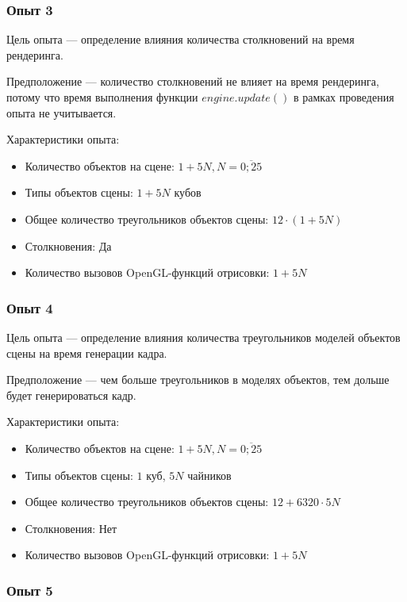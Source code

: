 \subsubsection{Опыт 3}

Цель опыта --- определение влияния количества столкновений на время рендеринга.

Предположение --- количество столкновений не влияет на время рендеринга, потому что время выполнения функции $engine.update()$ в рамках проведения опыта не учитывается.

Характеристики опыта:
\begin{itemize}
    \item Количество объектов на сцене: $1 + 5 N, N = \overline{0; 25}$
    \item Типы объектов сцены: $1 + 5 N$ кубов
    \item Общее количество треугольников объектов сцены: $12 \cdot (1 + 5 N)$
    \item Столкновения: Да
    \item Количество вызовов OpenGL-функций отрисовки: $1 + 5 N$
\end{itemize}

\subsubsection{Опыт 4}

Цель опыта --- определение влияния количества треугольников моделей объектов сцены на время генерации кадра.

Предположение --- чем больше треугольников в моделях объектов, тем дольше будет генерироваться кадр.

Характеристики опыта:
\begin{itemize}
    \item Количество объектов на сцене: $1 + 5 N, N = \overline{0; 25}$
    \item Типы объектов сцены: $1$ куб, $5 N$ чайников
    \item Общее количество треугольников объектов сцены: $12 + 6320 \cdot 5 N$
    \item Столкновения: Нет
    \item Количество вызовов OpenGL-функций отрисовки: $1 + 5 N$
\end{itemize}

\subsubsection{Опыт 5}

